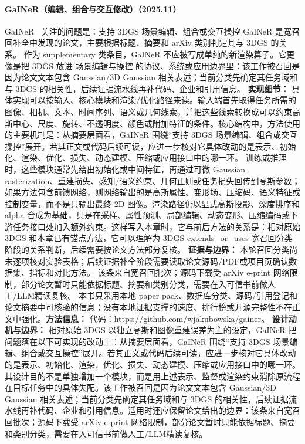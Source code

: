 \paragraph{GaINeR（编辑、组合与交互修改）（2025.11）}
GaINeR~\cite{2511_20924} 关注的问题是：支持 3DGS 场景编辑、组合或交互操控 GaINeR 是宽召回补全中发现的论文，主要根据标题、摘要和 arXiv 类别判定其与 3DGS 的关系。
作为 supplementary 类条目，GaINeR 不应被写成单纯的新渲染算子。它更像是把 3DGS 放进 场景编辑与操控 的协议、系统或应用边界里：该工作被召回是因为论文文本包含 Gaussian/3D Gaussian 相关表述；当前分类先确定其任务域和与 3DGS 的相关性，后续证据流水线再补代码、企业和引用信息。
\textbf{实现细节：} 具体实现可以按输入、核心模块和渲染/优化路径来读。输入端首先取得任务所需的图像、相机、文本、时间序列、语义或几何线索，并把这些线索转换成可以约束高斯中心、尺度、旋转、不透明度、颜色或附加特征的条件。核心结构中，方法使用的主要机制是：从摘要层面看，GaINeR 围绕“支持 3DGS 场景编辑、组合或交互操控”展开。若其正文或代码后续可读，应进一步核对它具体改动的是表示、初始化、渲染、优化、损失、动态建模、压缩或应用接口中的哪一环。 训练或推理时，这些模块通常先给出初始化或中间特征，再通过可微 Gaussian rasterization、重建损失、感知/语义约束、几何正则或任务损失回传到高斯参数；如果方法包含前馈网络，则网络输出的是高斯属性、变形场、压缩码、语义特征或控制变量，而不是只输出最终 2D 图像。渲染路径仍以显式高斯投影、深度排序和 alpha 合成为基础，只是在采样、属性预测、局部编辑、动态变形、压缩编码或下游任务接口处加入额外约束。这样写入本章时，它与前后方法的关系是：相对原始 3DGS 和本章已有锚点方法，它可以理解为 3DGS extends\_or\_uses 宽召回分类阶段的关系判断，后续需要按论文方法部分复核。
\textbf{证据与边界：} 本轮召回分类尚未逐项核对实验表格；后续证据补全阶段需要读取论文源码/PDF或项目页确认数据集、指标和对比方法。 该条来自宽召回批次；源码下载受 arXiv e-print 网络限制，部分论文暂时只能依据标题、摘要和类别分类，需要在入可信书前做人工/LLM精读复核。 本书只采用本地 paper pack、数据库分类、源码/引用登记和论文摘要中可核验的信息；没有本地证据支撑的速度、排行榜或开源完整性不在正文中强化。\textbf{方法信息：} 代码：\url{https://github.com/wjakubowska/gainer}。
\textbf{设计动机与边界：} 相对原始 3DGS 以独立高斯和图像重建误差为主的设定，GaINeR 把问题落在以下可实现的改动上：从摘要层面看，GaINeR 围绕“支持 3DGS 场景编辑、组合或交互操控”展开。若其正文或代码后续可读，应进一步核对它具体改动的是表示、初始化、渲染、优化、损失、动态建模、压缩或应用接口中的哪一环。其设计目的不是单独增加一个模块，而是用上述表示、监督或渲染约束消除原流程在目标任务中的具体失配。该工作被召回是因为论文文本包含 Gaussian/3D Gaussian 相关表述；当前分类先确定其任务域和与 3DGS 的相关性，后续证据流水线再补代码、企业和引用信息。适用时还应保留论文给出的边界：该条来自宽召回批次；源码下载受 arXiv e-print 网络限制，部分论文暂时只能依据标题、摘要和类别分类，需要在入可信书前做人工/LLM精读复核。
